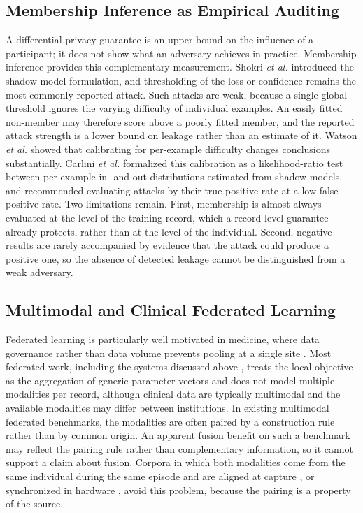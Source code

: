 \subsection{Membership Inference as Empirical Auditing}

A differential privacy guarantee is an upper bound on the influence of a
participant; it does not show what an adversary achieves in practice.
Membership inference provides this complementary measurement. Shokri \emph{et
al.} \cite{ref14} introduced the shadow-model formulation, and thresholding of
the loss or confidence \cite{ref15} remains the most commonly reported attack.
Such attacks are weak, because a single global threshold ignores the varying
difficulty of individual examples. An easily fitted non-member may therefore
score above a poorly fitted member, and the reported attack strength is a lower
bound on leakage rather than an estimate of it. Watson \emph{et al.}
\cite{ref16} showed that calibrating for per-example difficulty changes
conclusions substantially. Carlini \emph{et al.} \cite{ref17} formalized this
calibration as a likelihood-ratio test between per-example in- and
out-distributions estimated from shadow models, and recommended evaluating
attacks by their true-positive rate at a low false-positive rate. Two
limitations remain. First, membership is almost always evaluated at the level
of the training record, which a record-level guarantee already protects, rather
than at the level of the individual. Second, negative results are rarely
accompanied by evidence that the attack could produce a positive one, so the
absence of detected leakage cannot be distinguished from a weak adversary.

\subsection{Multimodal and Clinical Federated Learning}

Federated learning is particularly well motivated in medicine, where data
governance rather than data volume prevents pooling at a single site
\cite{ref18, ref19}. Most federated work, including the systems discussed above
\cite{ref9, ref3, ref4, ref10}, treats the local objective as the aggregation
of generic parameter vectors and does not model multiple modalities per record,
although clinical data are typically multimodal and the available modalities
may differ between institutions. In existing multimodal federated benchmarks,
the modalities are often paired by a construction rule rather than by common
origin. An apparent fusion benefit on such a benchmark may reflect the pairing
rule rather than complementary information, so it cannot support a claim about
fusion. Corpora in which both modalities come from the same individual during
the same episode and are aligned at capture \cite{ref20}, or synchronized in
hardware \cite{ref21}, avoid this problem, because the pairing is a property of
the source.

